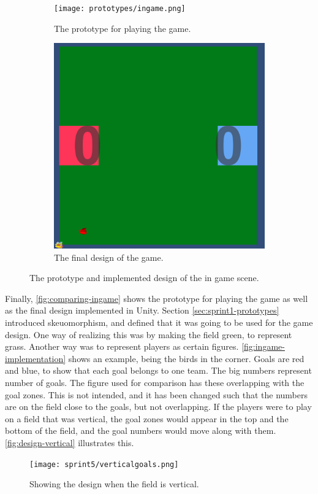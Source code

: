 \begin{figure}[H]
    \centering
    \begin{subfigure}{0.45\textwidth}
        \centering
        \texttt{[image: prototypes/ingame.png]}
        \caption{The prototype for playing the game.}
        \label{fig:ingame-prototype}
    \end{subfigure}
    \begin{subfigure}{0.45\textwidth}
        \centering
        \includegraphics[width=0.8\linewidth]{figures/sprint-4-game.PNG}
        \caption{The final design of the game.}
        \label{fig:ingame-implementation}
    \end{subfigure}
    \caption{The prototype and implemented design of the in game scene.}
    \label{fig:comparing-ingame}
\end{figure}
\noindent
Finally, \autoref{fig:comparing-ingame} shows the prototype for playing the game as well as the final design implemented in Unity.
Section \ref{sec:sprint1-prototypes} introduced skeuomorphism, and defined that it was going to be used for the game design.
One way of realizing this was by making the field green, to represent grass.
Another way was to represent players as certain figures.
\autoref{fig:ingame-implementation} shows an example, being the birds in the corner.
Goals are red and blue, to show that each goal belongs to one team.
The big numbers represent number of goals.
The figure used for comparison has these overlapping with the goal zones.
This is not intended, and it has been changed such that the numbers are on the field close to the goals, but not overlapping.
If the players were to play on a field that was vertical, the goal zones would appear in the top and the bottom of the field, and the goal numbers would move along with them.
\autoref{fig:design-vertical} illustrates this.
\begin{figure}[H]
    \centering
    \texttt{[image: sprint5/verticalgoals.png]}
    \caption{Showing the design when the field is vertical.}
    \label{fig:design-vertical}
\end{figure}


